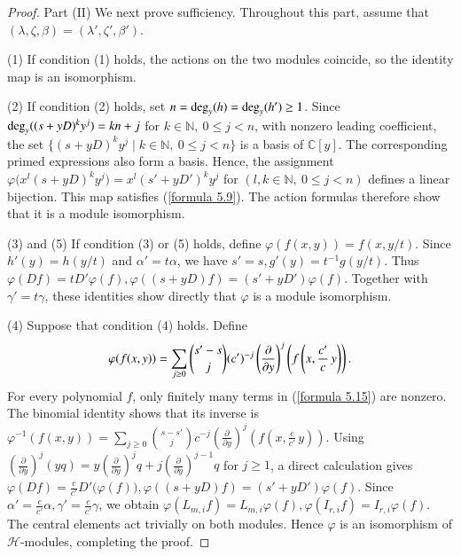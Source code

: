 \documentclass[12pt,reqno]{amsart}
\def\deg{{\rm deg}}
\numberwithin{equation}{section}
\begin{document}
\begin{proof}
Part ($\mathrm{II}$) We next prove sufficiency. Throughout this part, assume that $(\lambda, \zeta,\beta)=(\lambda',\zeta',\beta')$.

\rm(1) If condition (1) holds, the actions on the two modules coincide, so the identity map is an isomorphism.


\rm(2) If condition (2) holds, set $n=\deg_y (h)=\deg_y (h')\ge1$. Since $\deg_y((s+yD)^ky^j)=kn+j$ for $k\in\mathbb N,\ 0\le   j<n$, with nonzero leading coefficient, the set 
$\{(s+yD)^ky^j\mid k\in\mathbb N,\ 0\le j<n\}$ is a basis of $\mathbb C[y]$. The corresponding primed expressions also form a basis. Hence, the assignment $\varphi\bigl(x^l(s+yD)^ky^j\bigr) =x^l(s'+yD')^ky^j $ for $(l,k\in\mathbb N,\ 0\le j<n)$ defines a linear bijection. This map satisfies (\ref{formula 5.9}). The action formulas therefore show that it is a module isomorphism.


\rm(3) and \rm(5) If condition (3) or (5) holds, define $\varphi(f(x,y))=f(x,y/t)$. Since $h'(y)=h(y/t)$ and $\alpha'=t\alpha$, we have $s'=s, g'(y)=t^{-1}g(y/t)$. Thus $\varphi(Df)=tD'\varphi(f),\varphi((s+yD)f)=(s'+yD')\varphi(f)$. Together with $\gamma'=t\gamma$, these identities show directly that $\varphi$ is a module isomorphism.




\rm(4) 
Suppose that condition (4) holds. Define 
\begin{equation}\label{formula 5.15}
\aligned
  \varphi(f(x,y)) = \sum_{j\ge0} \binom{s'-s}{j}(c')^{- j} \left(       \frac{\partial}{\partial{y}}\right)^j\left(f\left(x,\frac{c'}c\,y\right)\right).
\endaligned
\end{equation}
For every polynomial $f$, only finitely many terms in (\ref{formula 5.15}) are nonzero. The binomial identity shows that its inverse is $\varphi^{-1}(f(x,y)) = \sum_{j\ge0} \binom{s-s'}{j}c^{- j} \left(       \frac{\partial}{\partial{y}}\right)^j\left(f\left(x,\frac c{c'}\,y\right)\right).$
Using $\left(       \frac{\partial}{\partial{y}}\right)^j(yq) =y\left(       \frac{\partial}{\partial{y}}\right)^jq+j\left(       \frac{\partial}{\partial{y}}\right)^{j-1}q$ for $j\ge 1$, a direct calculation gives $\varphi(Df)=\frac c{c'}D'\big(\varphi(f)\big),\varphi((s+yD)f)=(s'+yD')\varphi(f)$.
Since $\alpha'=\frac c{c'}\alpha,\gamma'=\frac c{c'}\gamma$, we obtain $\varphi(L_{m,i}f)=L_{m,i}\varphi(f),  \varphi(I_{r,i}f)=I_{r,i}\varphi(f)$. The central elements act trivially on both modules. Hence $\varphi$ is an isomorphism of $\mathcal{H}$-modules, completing the proof.



















    
\end{proof}
\end{document}
